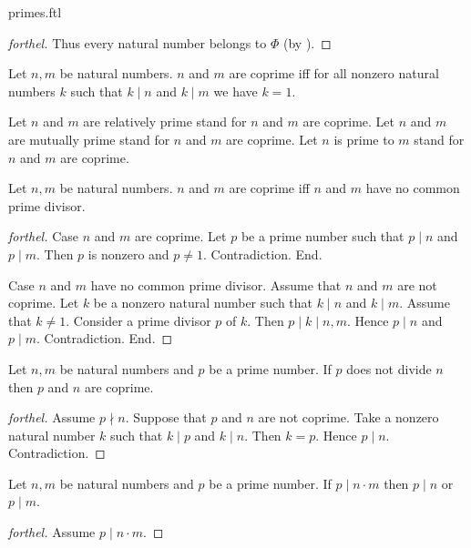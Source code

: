 \documentclass{naproche-library}
\begin{document}
\begin{smodule}{primes.ftl}
\begin{proof}[forthel]
    Thus every natural number belongs to $\Phi$ (by ).
  \end{proof}

  \begin{definition}[forthel,id=ARITHMETIC_10_463197419077632]
    Let $n, m$ be natural numbers.
    $n$ and $m$ are coprime iff for all nonzero natural numbers $k$ such that $k \mid n$ and $k \mid m$ we have $k = 1$.

    Let $n$ and $m$ are relatively prime stand for $n$ and $m$ are coprime.
    Let $n$ and $m$ are mutually prime stand for $n$ and $m$ are coprime.
    Let $n$ is prime to $m$ stand for $n$ and $m$ are coprime.
  \end{definition}

  \begin{proposition}[forthel,id=ARITHMETIC_10_5776394594287616]
    Let $n, m$ be natural numbers.
    $n$ and $m$ are coprime iff $n$ and $m$ have no common prime divisor.
  \end{proposition}
  \begin{proof}[forthel]
    Case $n$ and $m$ are coprime.
      Let $p$ be a prime number such that $p \mid n$ and $p \mid m$.
      Then $p$ is nonzero and $p \neq 1$.
      Contradiction.
    End.

    Case $n$ and $m$ have no common prime divisor.
      Assume that $n$ and $m$ are not coprime.
      Let $k$ be a nonzero natural number such that $k \mid n$ and $k \mid m$.
      Assume that $k \neq 1$.
      Consider a prime divisor $p$ of $k$.
      Then $p \mid k \mid n,m$.
      Hence $p \mid n$ and $p \mid m$.
      Contradiction.
    End.
  \end{proof}

  \begin{proposition}[forthel,id=ARITHMETIC_10_7212152851005440]
    Let $n, m$ be natural numbers and $p$ be a prime number.
    If $p$ does not divide $n$ then $p$ and $n$ are coprime.
  \end{proposition}
  \begin{proof}[forthel]
    Assume $p \nmid n$.
    Suppose that $p$ and $n$ are not coprime.
    Take a nonzero natural number $k$ such that $k \mid p$ and $k \mid n$.
    Then $k = p$.
    Hence $p \mid n$.
    Contradiction.
  \end{proof}

  \begin{proposition}[forthel,id=ARITHMETIC_10_8313676557713408]
    Let $n, m$ be natural numbers and $p$ be a prime number.
    If $p \mid n \cdot m$ then $p \mid n$ or $p \mid m$.
  \end{proposition}
  \begin{proof}[forthel]
    Assume $p \mid n \cdot m$.


\end{proof}
\end{smodule}
\end{document}
